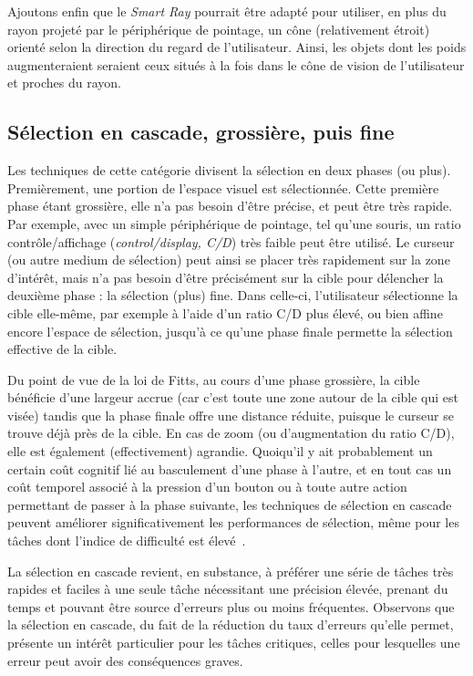 	Ajoutons enfin que le \emph{Smart Ray} pourrait être adapté pour utiliser, en plus du rayon projeté par le périphérique de pointage, un cône (relativement étroit) orienté selon la direction du regard de l'utilisateur. Ainsi, les objets dont les poids augmenteraient seraient ceux situés à la fois dans le cône de vision de l'utilisateur et proches du rayon.

	\subsection{Sélection en cascade, grossière, puis fine}
	Les techniques de cette catégorie divisent la sélection en deux phases (ou plus). Premièrement, une portion de l'espace visuel est sélectionnée. Cette première phase étant grossière, elle n'a pas besoin d'être précise, et peut être très rapide. Par exemple, avec un simple périphérique de pointage, tel qu'une souris, un ratio contrôle/affichage (\emph{control/display, C/D}) très faible peut être utilisé. Le curseur (ou autre medium de sélection) peut ainsi se placer très rapidement sur la zone d'intérêt, mais n'a pas besoin d'être précisément sur la cible pour délencher la deuxième phase : la sélection (plus) fine. Dans celle-ci, l'utilisateur sélectionne la cible elle-même, par exemple à l'aide d'un ratio C/D plus élevé, ou bien affine encore l'espace de sélection, jusqu'à ce qu'une phase finale permette la sélection effective de la cible.
	 
	Du point de vue de la loi de Fitts, au cours d'une phase grossière, la cible bénéficie d'une largeur accrue (car c'est toute une zone autour de la cible qui est visée) tandis que la phase finale offre une distance réduite, puisque le curseur se trouve déjà près de la cible. En cas de zoom (ou d'augmentation du ratio C/D), elle est également (effectivement) agrandie. Quoiqu'il y ait probablement un certain \og coût cognitif \fg{} lié au basculement d'une phase à l'autre, et en tout cas un coût temporel associé à la pression d'un bouton ou à toute autre action permettant de passer à la phase suivante, les techniques de sélection en cascade peuvent améliorer significativement les performances de sélection, même pour les tâches dont l'indice de difficulté est élevé~\cite{kopper2011rapid}.
	
	La sélection en cascade revient, en substance, à préférer une série de tâches très rapides et faciles à une seule tâche nécessitant une précision élevée, prenant du temps et pouvant être source d'erreurs plus ou moins fréquentes. Observons que la sélection en cascade, du fait de la réduction du taux d'erreurs qu'elle permet, présente un intérêt particulier pour les tâches critiques, celles pour lesquelles une erreur peut avoir des conséquences graves.
	
